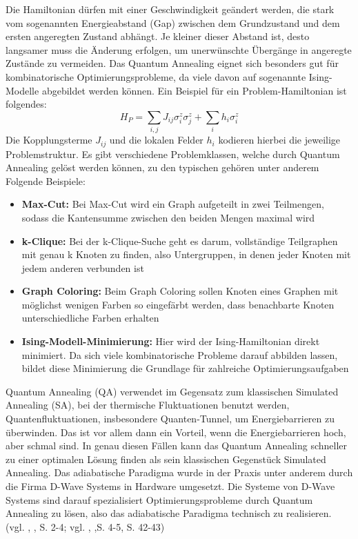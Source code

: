 Die Hamiltonian dürfen mit einer Geschwindigkeit geändert werden, die stark vom sogenannten Energieabstand (Gap) zwischen dem Grundzustand und dem ersten angeregten Zustand abhängt. Je kleiner dieser Abstand ist, desto langsamer muss die Änderung erfolgen, um unerwünschte Übergänge in angeregte Zustände zu vermeiden. 
Das Quantum Annealing eignet sich besonders gut für kombinatorische Optimierungsprobleme, da viele davon auf sogenannte Ising-Modelle abgebildet werden können. Ein Beispiel für ein Problem-Hamiltonian ist folgendes:
$$
H_P = \sum_{i,j} J_{ij}\sigma_i^z\sigma_j^z + \sum_i h_i\sigma_i^z
$$
Die Kopplungsterme $J_{ij}$ und die lokalen Felder $h_i$ kodieren hierbei die jeweilige Problemstruktur.
Es gibt verschiedene Problemklassen, welche durch Quantum Annealing gelöst werden können, zu den typischen gehören unter anderem Folgende Beispiele: 
\begin{itemize}
    \item \textbf{Max-Cut: }Bei Max-Cut wird ein Graph aufgeteilt in zwei Teilmengen, sodass die Kantensumme zwischen den beiden Mengen maximal wird 
    \item 	\textbf{k-Clique:} Bei der k-Clique-Suche geht es darum, vollständige Teilgraphen mit genau k Knoten zu finden, also Untergruppen, in denen jeder Knoten mit jedem anderen verbunden ist 
    \item \textbf{Graph Coloring: }Beim Graph Coloring sollen Knoten eines Graphen mit möglichst wenigen Farben so eingefärbt werden, dass benachbarte Knoten unterschiedliche Farben erhalten 
    \item \textbf{Ising-Modell-Minimierung:} Hier wird der Ising-Hamiltonian direkt minimiert. Da sich viele kombinatorische Probleme darauf abbilden lassen, bildet diese Minimierung die Grundlage für zahlreiche Optimierungsaufgaben 
\end{itemize}
Quantum Annealing (QA) verwendet im Gegensatz zum klassischen Simulated Annealing (SA), bei der thermische Fluktuationen benutzt werden, Quantenfluktuationen, insbesondere Quanten-Tunnel, um Energiebarrieren zu überwinden. Das ist vor allem dann ein Vorteil, wenn die Energiebarrieren hoch, aber schmal sind. In genau diesen Fällen kann das Quantum Annealing schneller zu einer optimalen Lösung finden als sein klassischen Gegenstück Simulated Annealing. 
Das adiabatische Paradigma wurde in der Praxis unter anderem durch die Firma D-Wave Systems in Hardware umgesetzt. Die Systeme von D-Wave Systems sind darauf spezialisiert Optimierungsprobleme durch Quantum Annealing zu lösen, also das adiabatische Paradigma technisch zu realisieren. 
(vgl. \citeauthor{rajak_quantum_nodate}, \citeyear{rajak_quantum_nodate}, S. 2-4; vgl. \citeauthor{albash_adiabatic_2018}, \citeyear{albash_adiabatic_2018},S. 4-5, S. 42-43)
